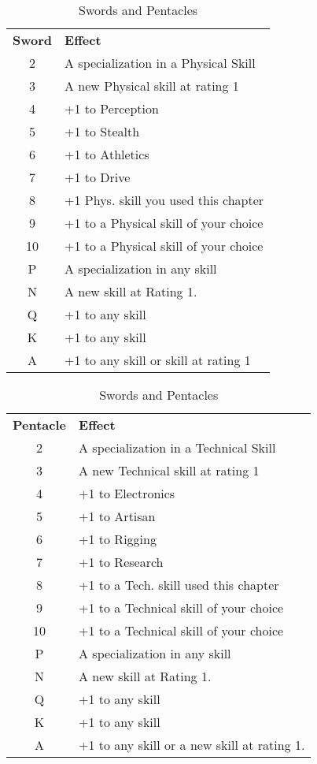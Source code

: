 \begin{table}[htb]
\caption{Swords and Pentacles}
\begin{minipage}{0.4\textwidth}
\begin{tabular}{c l}
\textbf{Sword} & \textbf{Effect}\\
2 & A specialization in a Physical Skill\\
3 & A new Physical skill at rating 1\\
4 & +1 to Perception\\
5 & +1 to Stealth\\
6 & +1 to Athletics\\
7 & +1 to Drive\\
8 & +1 Phys. skill you used this chapter\\
9 & +1 to a Physical skill of your choice\\
10 & +1 to a Physical skill of your choice\\
P & A specialization in any skill\\
N & A new skill at Rating 1.\\
Q & +1 to any skill\\
K & +1 to any skill\\
A & +1 to any skill or skill at rating 1\\
\end{tabular}
\end{minipage}
\hspace{1.5cm}
\begin{minipage}{0.4\textwidth}
\begin{tabular}{c l}
\textbf{Pentacle} & \textbf{Effect}\\
2 & A specialization in a Technical Skill\\
3 & A new Technical skill at rating 1\\
4 & +1 to Electronics\\
5 & +1 to Artisan\\
6 & +1 to Rigging\\
7 & +1 to Research\\
8 & +1 to a Tech. skill used this chapter\\
9 & +1 to a Technical skill of your choice\\
10 & +1 to a Technical skill of your choice\\
P & A specialization in any skill\\
N & A new skill at Rating 1.\\
Q & +1 to any skill\\
K & +1 to any skill\\
A & +1 to any skill or a new skill at rating 1.\\
\end{tabular}
\end{minipage}
\end{table}

